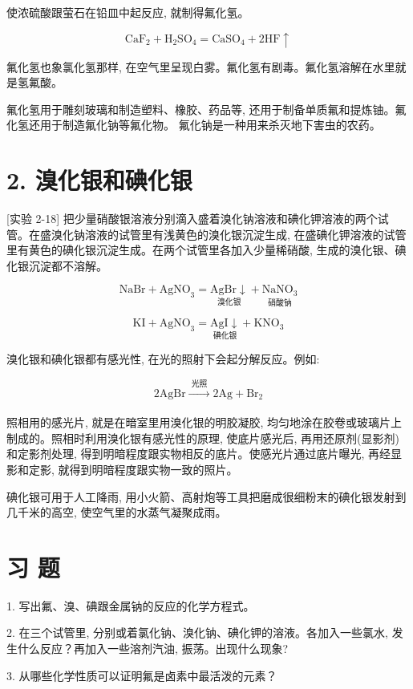 \documentclass[10pt]{article}
\begin{document}
使浓硫酸跟萤石在铅皿中起反应, 就制得氟化氢。

\[
{\mathrm{{CaF}}}_{2} + {\mathrm{H}}_{2}{\mathrm{{SO}}}_{4} = {\mathrm{{CaSO}}}_{4} + 2\mathrm{{HF}} \uparrow
\]

氟化氢也象氯化氢那样, 在空气里呈现白雾。氟化氢有剧毒。氟化氢溶解在水里就是氢氟酸。

氟化氢用于雕刻玻璃和制造塑料、橡胶、药品等, 还用于制备单质氟和提炼铀。氟化氢还用于制造氟化钠等氟化物。 氟化钠是一种用来杀灭地下害虫的农药。

\section*{2. 溴化银和碘化银}

[实验 2-18] 把少量硝酸银溶液分别滴入盛着溴化钠溶液和碘化钾溶液的两个试管。在盛溴化钠溶液的试管里有浅黄色的溴化银沉淀生成, 在盛碘化钾溶液的试管里有黄色的碘化银沉淀生成。在两个试管里各加入少量稀硝酸, 生成的溴化银、碘化银沉淀都不溶解。

\[
\mathrm{{NaBr}} + {\mathrm{{AgNO}}}_{3} = \underset{\text{ 溴化银 }}{\mathrm{{AgBr}} \downarrow } + \underset{\text{ 硝酸钠 }}{{\mathrm{{NaNO}}}_{3}}
\]

\[
\mathrm{{KI}} + {\mathrm{{AgNO}}}_{3} = \underset{\text{ 碘化银 }}{\mathrm{{AgI}} \downarrow } + {\mathrm{{KNO}}}_{3}
\]

溴化银和碘化银都有感光性, 在光的照射下会起分解反应。例如:

\[
2\mathrm{{AgBr}}\xrightarrow[]{\text{ 光照 }}2\mathrm{{Ag}} + {\mathrm{{Br}}}_{2}
\]

照相用的感光片, 就是在暗室里用溴化银的明胶凝胶, 均匀地涂在胶卷或玻璃片上制成的。照相时利用溴化银有感光性的原理, 使底片感光后, 再用还原剂(显影剂) 和定影剂处理, 得到明暗程度跟实物相反的底片。使感光片通过底片曝光, 再经显影和定影, 就得到明暗程度跟实物一致的照片。

碘化银可用于人工降雨, 用小火箭、高射炮等工具把磨成很细粉末的碘化银发射到几千米的高空, 使空气里的水蒸气凝聚成雨。

\section*{习 题}

1. 写出氟、溴、碘跟金属钠的反应的化学方程式。

2. 在三个试管里, 分别或着氯化钠、溴化钠、碘化钾的溶液。各加入一些氯水, 发生什么反应？再加入一些溶剂汽油, 振荡。出现什么现象?

3. 从哪些化学性质可以证明氟是卤素中最活泼的元素？
\end{document}
